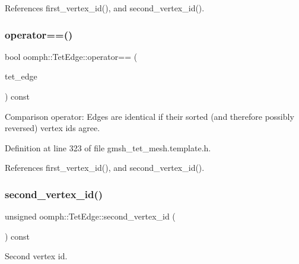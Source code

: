 References first\+\_\+vertex\+\_\+id(), and second\+\_\+vertex\+\_\+id().

\mbox{\label{classoomph_1_1TetEdge_a07cbad9bf3e951fcdfab23575c42e379}} 
\subsubsection{\texorpdfstring{operator==()}{operator==()}}
{\footnotesize\ttfamily bool oomph\+::\+Tet\+Edge\+::operator== (\begin{DoxyParamCaption}\item[{const \hyperlink{classoomph_1_1TetEdge}{Tet\+Edge} \&}]{tet\+\_\+edge }\end{DoxyParamCaption}) const\hspace{0.3cm}{\ttfamily [inline]}}



Comparison operator\+: Edges are identical if their sorted (and therefore possibly reversed) vertex ids agree. 



Definition at line 323 of file gmsh\+\_\+tet\+\_\+mesh.\+template.\+h.



References first\+\_\+vertex\+\_\+id(), and second\+\_\+vertex\+\_\+id().

\mbox{\label{classoomph_1_1TetEdge_a5ab63d3dece25fd81b5dad00b7fc8b3f}} 
\subsubsection{\texorpdfstring{second\+\_\+vertex\+\_\+id()}{second\_vertex\_id()}}
{\footnotesize\ttfamily unsigned oomph\+::\+Tet\+Edge\+::second\+\_\+vertex\+\_\+id (\begin{DoxyParamCaption}{ }\end{DoxyParamCaption}) const\hspace{0.3cm}{\ttfamily [inline]}}



Second vertex id. 



